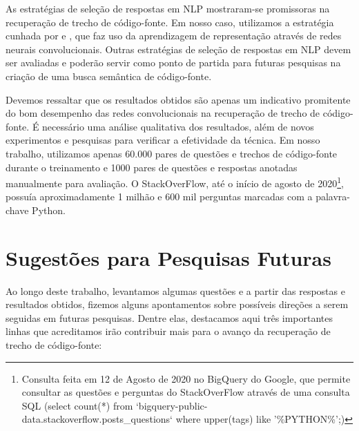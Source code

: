 As estratégias de seleção de respostas em NLP mostraram-se promissoras na recuperação de trecho de código-fonte. Em nosso caso, utilizamos a estratégia cunhada por \cite{feng-2015} e \cite{tan-lstm-qa}, que faz uso da aprendizagem de representação através de redes neurais convolucionais. Outras estratégias de seleção de respostas em NLP devem ser avaliadas e poderão servir como ponto de partida para futuras pesquisas na criação de uma busca semântica de código-fonte.

Devemos ressaltar que os resultados obtidos são apenas um indicativo promitente do bom desempenho das redes convolucionais na recuperação de trecho de código-fonte. É necessário uma análise qualitativa dos resultados, além de novos experimentos e pesquisas para verificar a efetividade da técnica. Em nosso trabalho, utilizamos apenas 60.000 pares de questões e trechos de código-fonte durante o treinamento e 1000 pares de questões e respostas anotadas manualmente para avaliação. O StackOverFlow, até o início de agosto de 2020\footnote{Consulta feita em 12 de Agosto de 2020 no BigQuery do Google, que permite consultar as questões e perguntas do StackOverFlow através de uma consulta SQL (select count(*) from `bigquery-public-data.stackoverflow.posts\_questions` where upper(tags) like '\%PYTHON\%';)}, possuía aproximadamente 1 milhão e 600 mil perguntas marcadas com a palavra-chave Python.



\section{Sugestões para Pesquisas Futuras} 

Ao longo deste trabalho, levantamos algumas questões e a partir das respostas e resultados obtidos, fizemos alguns apontamentos sobre possíveis direções a serem seguidas em futuras pesquisas. Dentre elas, destacamos aqui três importantes linhas que acreditamos irão contribuir mais para o avanço da recuperação de trecho de código-fonte:

